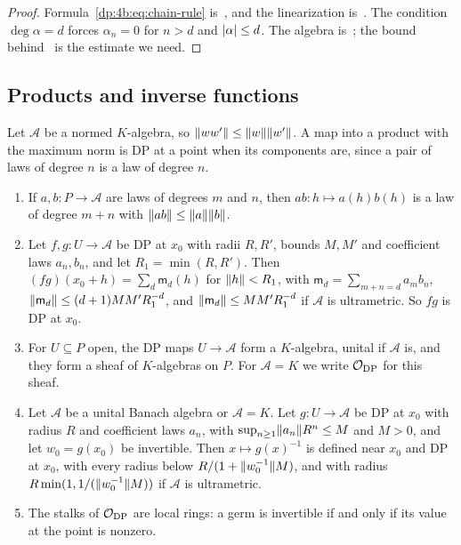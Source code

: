 \begin{proof}
Formula~\eqref{dp:4b:eq:chain-rule} is~\cite[Lemma~Q.3]{I}, and the linearization is~\cite[Lemma~Q.4]{I}. The condition $\deg\alpha=d$ forces $\alpha_n=0$ for $n>d$ and $\lvert \alpha\rvert\le d$. The algebra is~\cite[VI~\S8, Prop.~VI.6, Cor.; Prop.~I.2; II~\S1]{Ro}; the bound behind~\cite[Lemma~Q.3]{I} is the estimate we need.
\end{proof}

\subsection{Products and inverse functions}\label{dp:ssec:inverse}

Let $\mathcal A$ be a normed $K$\nobreakdash-algebra, so $\lVert ww'\rVert\le\lVert w\rVert\lVert w'\rVert$. A map into a product with the maximum norm is DP at a point when its components are, since a pair of laws of degree $n$ is a law of degree $n$.

\begin{proposition}\label{dp:prop:products}
\leavevmode
\begin{enumerate}
\item If $a,b\colon P\to\mathcal A$ are laws of degrees $m$ and $n$, then $ab\colon h\mapsto a(h)b(h)$ is a law of degree $m+n$ with $\lVert ab\rVert\le\lVert a\rVert\lVert b\rVert$.
\item Let $f,g\colon U\to\mathcal A$ be DP at $x_0$ with radii $R,R'$, bounds $M,M'$ and coefficient laws $a_n,b_n$, and let $R_1=\min(R,R')$. Then $(fg)(x_0+h)=\sum_d\mathsf m_d(h)$ for $\lVert h\rVert<R_1$, with $\mathsf m_d=\sum_{m+n=d}a_mb_n$, $\lVert \mathsf m_d\rVert\le(d+1)MM'R_1^{-d}$, and $\lVert \mathsf m_d\rVert\le MM'R_1^{-d}$ if $\mathcal A$ is ultrametric. So $fg$ is DP at $x_0$.
\item For $U\subseteq P$ open, the DP maps $U\to\mathcal A$ form a $K$\nobreakdash-algebra, unital if $\mathcal A$ is, and they form a sheaf of $K$\nobreakdash-algebras on $P$. For $\mathcal A=K$ we write $\mathcal O_{\rm DP}$ for this sheaf.
\item Let $\mathcal A$ be a unital Banach algebra or $\mathcal A=K$. Let $g\colon U\to\mathcal A$ be DP at $x_0$ with radius $R$ and coefficient laws $a_n$, with $\sup_{n\ge1}\lVert a_n\rVert R^n\le M$ and $M>0$, and let $w_0=g(x_0)$ be invertible. Then $x\mapsto g(x)^{-1}$ is defined near $x_0$ and DP at $x_0$, with every radius below $R/(1+\lVert w_0^{-1}\rVert M)$, and with radius $R\min(1,1/(\lVert w_0^{-1}\rVert M))$ if $\mathcal A$ is ultrametric.
\item The stalks of $\mathcal O_{\rm DP}$ are local rings: a germ is invertible if and only if its value at the point is nonzero.
\end{enumerate}
\end{proposition}

